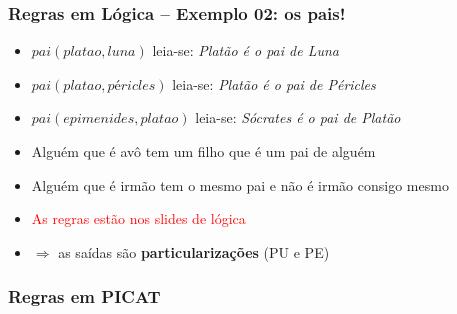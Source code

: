 \documentclass[10pt]{beamer}
\begin{document}
\begin{frame}
    \frametitle{Regras  em Lógica -- Exemplo 02: os pais!}
    \begin{itemize}
    
    \item $pai(platao, luna)$ \hspace{1.5cm} leia-se: \textit{Platão é o pai de Luna}
    \item $pai(platao, péricles)$ \hspace{1.5cm} leia-se: \textit{Platão é o pai de Péricles}
    \item $pai(epimenides, platao)$ \hspace{1.5cm} leia-se: \textit{Sócrates é o pai de Platão}
    
    \pause
    \item Alguém que é avô tem um filho que é um pai de alguém
    \pause
    \item Alguém que é irmão tem o mesmo pai e não é irmão consigo mesmo
    \pause
    \item \textcolor{red}{As regras estão nos slides de lógica}

    \item  $\Rightarrow $ as saídas são \textbf{particularizações} (PU e PE)
 
    \end{itemize}
\end{frame}

\begin{frame}[allowframebreaks=0.9]
 \frametitle{Regras em PICAT}



\end{frame}


\end{document}
